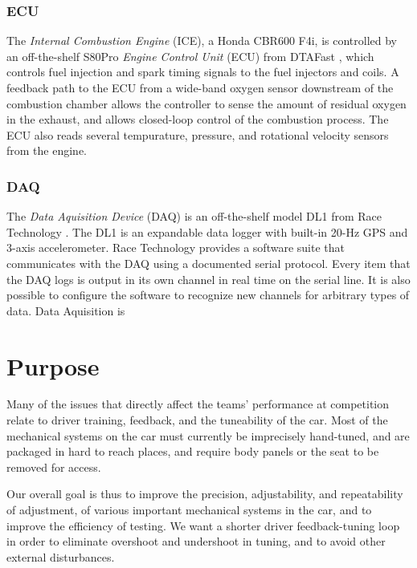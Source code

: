 \subsubsection{ECU}


The \emph{Internal Combustion Engine} (ICE), a Honda CBR600 F4i, is controlled by an off-the-shelf S80Pro \emph{Engine Control Unit} (ECU) from DTAFast \cite{s60pro}, which controls fuel injection and spark timing signals to the fuel injectors and coils. A feedback path to the ECU from a wide-band oxygen sensor downstream of the combustion chamber allows the controller to sense the amount of residual oxygen in the exhaust, and allows closed-loop control of the combustion process. The ECU also reads several tempurature, pressure, and rotational velocity sensors from the engine.

\subsubsection{DAQ}

The \emph{Data Aquisition Device} (DAQ) is an off-the-shelf model DL1 from Race Technology \cite{DL1Dsheet}. The DL1 is an expandable data logger with built-in 20-Hz GPS and 3-axis accelerometer. Race Technology provides a software suite that communicates with the DAQ using a documented serial protocol. Every item that the DAQ logs is output in its own channel in real time on the serial line. It is also possible to configure the software to recognize new channels for arbitrary types of data.
Data Aquisition is 

\section{Purpose}

Many of the issues that directly affect the teams' performance at
competition relate to driver training, feedback, and the tuneability
of the car. Most of the mechanical systems on the car must currently
be imprecisely hand-tuned, and are packaged in hard to reach places,
and require body panels or the seat to be removed for access.

Our overall goal is thus to improve the precision, adjustability, and
repeatability of adjustment, of various important mechanical systems
in the car, and to improve the efficiency of testing. We want a shorter
driver feedback-tuning loop in order to eliminate
overshoot and undershoot in tuning, and to avoid other external disturbances.

